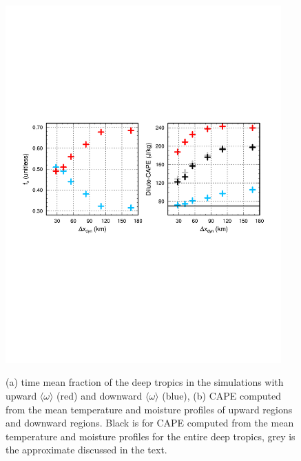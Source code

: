 \begin{figure}[t]
\begin{center}
\noindent\includegraphics[width=25pc,angle=0]{chapter6/temp_cape.pdf}\\
\end{center}
\caption{(a) time mean fraction of the deep tropics in the simulations with upward $\langle \omega \rangle$ (red) and downward $\langle \omega \rangle$ (blue), (b) CAPE computed from the mean temperature and moisture profiles of upward regions and downward regions. Black is for CAPE computed from the mean temperature and moisture profiles for the entire deep tropics, grey is the approximate discussed in the text.}
\label{fig:cape}
\end{figure}

